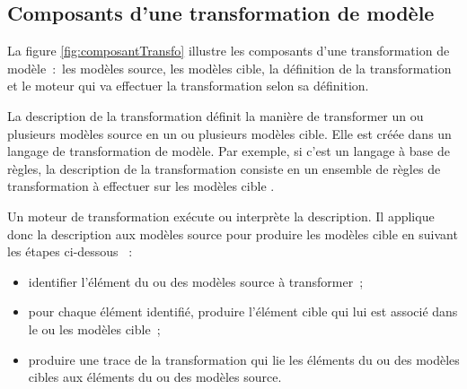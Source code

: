 \subsection{Composants d'une transformation de modèle} 
La figure \ref{fig:composantTransfo} illustre les composants d'une 
transformation de modèle~:~les modèles source, les modèles cible, la définition 
de la transformation et le moteur qui va effectuer la transformation selon sa 
définition. 

La description de la transformation définit la manière de transformer un ou plusieurs modèles source en un ou plusieurs modèles cible. Elle est créée dans 
un langage de transformation de modèle. Par exemple, si c'est un langage à base 
de règles, la description de la transformation consiste en un ensemble de règles 
de transformation à effectuer sur les modèles cible \cite{kleppe2003mda}. 

Un moteur de transformation exécute ou interprète la description. Il applique 
donc la description aux modèles source pour produire les modèles cible en 
suivant les étapes ci-dessous \cite{tratt2005model}~:

\begin{itemize}
\item identifier l'élément du ou des modèles source à transformer~;
\item pour chaque élément identifié, produire l'élément cible qui lui est 
associé dans le ou les modèles cible~;
\item produire une trace de la transformation qui lie les éléments du ou des 
modèles cibles aux éléments du ou des modèles source.
\end{itemize}


